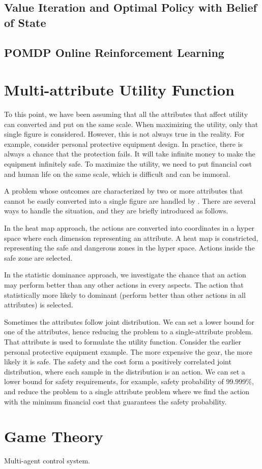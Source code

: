 \subsection{Value Iteration and Optimal Policy with Belief of State}

\subsection{POMDP Online Reinforcement Learning}

\section{Multi-attribute Utility Function}

To this point, we have been assuming that all the attributes that affect utility can converted and put on the same scale. When maximizing the utility, only that single figure is considered. However, this is not always true in the reality. For example, consider personal protective equipment design. In practice, there is always a chance that the protection fails. It will take infinite money to make the equipment infinitely safe. To maximize the utility, we need to put financial cost and human life on the same scale, which is difficult and can be immoral.

A problem whose outcomes are characterized by two or more attributes that cannot be easily converted into a single figure are handled by . There are several ways to handle the situation, and they are briefly introduced as follows.

In the heat map approach, the actions are converted into coordinates in a hyper space where each dimension representing an attribute. A heat map is constricted, representing the safe and dangerous zones in the hyper space. Actions inside the safe zone are selected.

In the statistic dominance approach, we investigate the chance that an action may perform better than any other actions in every aspects. The action that statistically more likely to dominant (perform better than other actions in all attributes) is selected.

Sometimes the attributes follow joint distribution. We can set a lower bound for one of the attributes, hence reducing the problem to a single-attribute problem. That attribute is used to formulate the utility function. Consider the earlier personal protective equipment example. The more expensive the gear, the more likely it is safe. The safety and the cost form a positively correlated joint distribution, where each sample in the distribution is an action. We can set a lower bound for safety requirements, for example, safety probability of $99.999\%$, and reduce the problem to a single attribute problem where we find the action with the minimum financial cost that guarantees the safety probability.

\section{Game Theory}

Multi-agent control system.